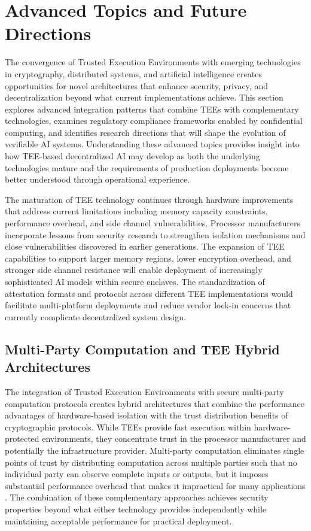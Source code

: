 \section{Advanced Topics and Future Directions}

The convergence of Trusted Execution Environments with emerging technologies in cryptography, distributed systems, and artificial intelligence creates opportunities for novel architectures that enhance security, privacy, and decentralization beyond what current implementations achieve. This section explores advanced integration patterns that combine TEEs with complementary technologies, examines regulatory compliance frameworks enabled by confidential computing, and identifies research directions that will shape the evolution of verifiable AI systems. Understanding these advanced topics provides insight into how TEE-based decentralized AI may develop as both the underlying technologies mature and the requirements of production deployments become better understood through operational experience.

The maturation of TEE technology continues through hardware improvements that address current limitations including memory capacity constraints, performance overhead, and side channel vulnerabilities. Processor manufacturers incorporate lessons from security research to strengthen isolation mechanisms and close vulnerabilities discovered in earlier generations. The expansion of TEE capabilities to support larger memory regions, lower encryption overhead, and stronger side channel resistance will enable deployment of increasingly sophisticated AI models within secure enclaves. The standardization of attestation formats and protocols across different TEE implementations would facilitate multi-platform deployments and reduce vendor lock-in concerns that currently complicate decentralized system design.

\subsection{Multi-Party Computation and TEE Hybrid Architectures}



The integration of Trusted Execution Environments with secure multi-party computation protocols creates hybrid architectures that combine the performance advantages of hardware-based isolation with the trust distribution benefits of cryptographic protocols. While TEEs provide fast execution within hardware-protected environments, they concentrate trust in the processor manufacturer and potentially the infrastructure provider. Multi-party computation eliminates single points of trust by distributing computation across multiple parties such that no individual party can observe complete inputs or outputs, but it imposes substantial performance overhead that makes it impractical for many applications \cite{secure_mpc}. The combination of these complementary approaches achieves security properties beyond what either technology provides independently while maintaining acceptable performance for practical deployment.

